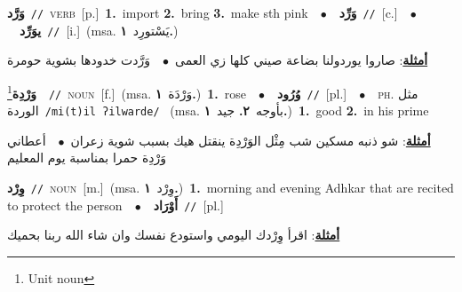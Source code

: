 \documentclass[10pt,a4paper,twoside]{article} %
\begin{document}
\begin{multicols}{2}
{\setlength\topsep{0pt}\textbf{\foreignlanguage{arabic}{وَرَّد}}\ {\color{gray}\texttt{//}\color{black}}\ \textsc{verb}\ [p.]\ \textbf{1.}~import  \textbf{2.}~bring  \textbf{3.}~make sth pink\ \ $\bullet$\ \ \setlength\topsep{0pt}\textbf{\foreignlanguage{arabic}{وَرِّد}}\ {\color{gray}\texttt{//}\color{black}}\ [c.]\ \ $\bullet$\ \ \setlength\topsep{0pt}\textbf{\foreignlanguage{arabic}{يوَرِّد}}\ {\color{gray}\texttt{//}\color{black}}\ [i.]\ \color{gray}(msa. \foreignlanguage{arabic}{يَسْتورِد}~\foreignlanguage{arabic}{\textbf{١.}})\color{black}\  \begin{flushright}\color{gray}\foreignlanguage{arabic}{\textbf{\underline{\foreignlanguage{arabic}{أمثلة}}}: صاروا يوردولنا بضاعة صيني كلها زي العمى\ $\bullet$\ \  وَرَّدت خدودها بشوية حومرة}\end{flushright}\color{black}} \vspace{2mm}

{\setlength\topsep{0pt}\textbf{\foreignlanguage{arabic}{وَرْدِة}}\footnote{Unit noun}\ \ {\color{gray}\texttt{//}\color{black}}\ \textsc{noun}\ [f.]\ \color{gray}(msa. \foreignlanguage{arabic}{وَرْدَة}~\foreignlanguage{arabic}{\textbf{١.}})\color{black}\ \textbf{1.}~rose\ \ $\bullet$\ \ \setlength\topsep{0pt}\textbf{\foreignlanguage{arabic}{وُرُود}}\ {\color{gray}\texttt{//}\color{black}}\ [pl.]\ \ $\bullet$\ \ \textsc{ph.} \color{gray} \foreignlanguage{arabic}{مثل الوردة}\color{black}\ {\color{gray}\texttt{/{\sffamily mi(t)il ʔilwarde}/}\color{black}}\ \color{gray} (msa. \foreignlanguage{arabic}{بأوجه}~\foreignlanguage{arabic}{\textbf{٢.}}  \foreignlanguage{arabic}{جيد}~\foreignlanguage{arabic}{\textbf{١.}})\color{black}\ \textbf{1.}~good  \textbf{2.}~in his prime\  \begin{flushright}\color{gray}\foreignlanguage{arabic}{\textbf{\underline{\foreignlanguage{arabic}{أمثلة}}}: شو ذنبه مسكين شب مِثْل الوَرْدِة ينقتل هيك بسبب شوية زعران\ $\bullet$\ \  أعطاني وَرْدِة حمرا بمناسبة يوم المعليم}\end{flushright}\color{black}} \vspace{2mm}

{\setlength\topsep{0pt}\textbf{\foreignlanguage{arabic}{وِرْد}}\ {\color{gray}\texttt{//}\color{black}}\ \textsc{noun}\ [m.]\ \color{gray}(msa. \foreignlanguage{arabic}{وِرْد}~\foreignlanguage{arabic}{\textbf{١.}})\color{black}\ \textbf{1.}~morning and evening Adhkar that are recited to protect the person\ \ $\bullet$\ \ \setlength\topsep{0pt}\textbf{\foreignlanguage{arabic}{أَوْرَاد}}\ {\color{gray}\texttt{//}\color{black}}\ [pl.]\  \begin{flushright}\color{gray}\foreignlanguage{arabic}{\textbf{\underline{\foreignlanguage{arabic}{أمثلة}}}: اقرأ وِرْدك اليومي واستودع نفسك وان شاء الله ربنا بحميك}\end{flushright}\color{black}} \vspace{2mm}


\end{multicols}
\end{document}
